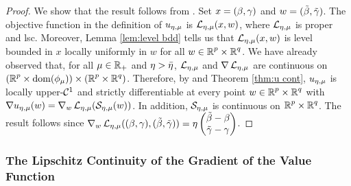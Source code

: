 \begin{proof} 
We show that the result follows from \cite[Theorem 10.58]{rockafellar2009variational}.
Set $x=\bg$ and $w=\tbg$. The objective function in the definition of
$\uemu$ is $\LL_\emu(x,w)$, where $\LL_\emu$  is proper and lsc.
Moreover, Lemma \ref{lem:level bdd} tells us that
$\LL_\emu(x,w)$ is level bounded in $x$ locally uniformly in $w$
for all $w\in \Rp\times\Rq$. We have already observed that, 
for all $\mu\in\R_+$ and $\eta>\blam$, $\LL_{\emu}$ and  $\nabla \LL_{\emu}$ 
are continuous
on $(\Rp\times\dom(\phimu))\times(\Rp\times\Rq)$.
Therefore, by \cite[Theorem 10.58]{rockafellar2009variational}
and Theorem \ref{thm:u cont}, $\uemu$ is locally upper-$\CC^1$
and strictly differentiable at every point $w\in\Rp\times\Rq$ with
$\nabla \uemu(w)=\nabla _w\LL_{\emu}(\SS_\emu(w))$.
In addition, $\SS_\emu$ is continuous on 
$\Rp\times\Rq$.
The result follows since $\nabla _w\LL_{\emu}(\bg,\tbg)
=\eta\begin{pmatrix}\tbeta-\beta\\ \tgam-\gam\end{pmatrix}
$.
\end{proof}

\subsubsection{The Lipschitz Continuity of the Gradient of the Value Function}

